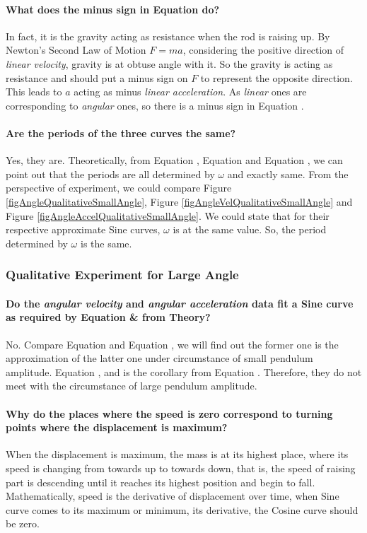 \paragraph{What does the minus sign in Equation  do?}
In fact, it is the gravity acting as resistance when the rod is raising up. By Newton's Second Law of Motion $F=ma$, considering the positive direction of \emph{linear velocity}, gravity is at obtuse angle with it. So the gravity is acting as resistance and should put a minus sign on $F$ to represent the opposite direction. This leads to $a$ acting as minus \emph{linear acceleration}. As \emph{linear} ones are corresponding to \emph{angular} ones, so there is a minus sign in Equation .

\paragraph{Are the periods of the three curves the same?} Yes, they are. Theoretically, from Equation , Equation  and Equation , we can point out that the periods are all determined by $\omega$ and exactly same. From the perspective of experiment, we could compare Figure \ref{figAngleQualitativeSmallAngle}, Figure \ref{figAngleVelQualitativeSmallAngle} and Figure \ref{figAngleAccelQualitativeSmallAngle}. We could state that for their respective approximate Sine curves, $\omega$ is at the same value. So, the period determined by $\omega$ is the same.

\subsubsection{Qualitative Experiment for Large Angle}

\paragraph{Do the \emph{angular velocity} and \emph{angular acceleration} data fit a Sine curve as required by Equation  \&  from Theory?}
No. Compare Equation  and Equation , we will find out the former one is the approximation of the latter one under circumstance of small pendulum amplitude. Equation ,  and  is the corollary from Equation . Therefore, they do not meet with the circumstance of large pendulum amplitude.

\paragraph{Why do the places where the speed is zero correspond to turning points where the displacement is maximum?}
When the displacement is maximum, the mass is at its highest place, where its speed is changing from towards up to towards down, that is, the speed of raising part is descending until it reaches its highest position and begin to fall. Mathematically, speed is the derivative of displacement over time, when Sine curve comes to its maximum or minimum, its derivative, the Cosine curve should be zero.

